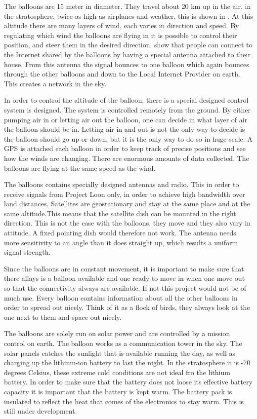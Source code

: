 The balloons are 15 meter in diameter. They travel about 20 km up in the air, in the stratosphere, twice as high as airplanes and weather, this is shown in . At this altitude there are many layers of wind, each varies in direction and speed. By regulating which wind the balloons are flying in it is possible to control their position, and steer them in the desired direction.  show that  people can connect to the Internet shared by the balloons by having a special antenna attached to their house. From this antenna the signal bounces to one balloon which again bounces through the other balloons and down to the Local Internet Provider on earth. This creates a network in the sky. 

In order to control the altitude of the balloon, there is a special designed control system is designed. The system is controlled remotely from the ground. By either pumping air in or letting air out the balloon, one can decide in what layer of air the balloon should be in. Letting air in and out is not the only way to decide is the balloon should go up or down, but it is the only way to do so in huge scale. A GPS is attached each balloon in order to keep track of precise positions and see how the winds are changing. There are enormous amounts of data collected. The balloons are flying at the same speed as the wind.  

The balloons contains specially designed antennas and radio. This in order to receive signals from Project Loon only, in order to achieve high bandwidth over land distances. 
Satellites are geostationary and stay at the same place and at the same altitude.This means that the satellite dish can be mounted in the right direction. This is not the case with the balloons, they move and they also vary in attitude. A fixed pointing dish would therefore not work. The antenna needs more sensitivity to an angle than it does straight up, which results a uniform signal strength. 

Since the balloons are in constant movement, it is important to make sure that there allays is a balloon available and one ready to move in when one move out so that the connectivity always are available. If not this project would not be of much use. Every balloon contains information about all the other balloons in order to spread out nicely. Think of it as a flock of birds, they always look at the one next to them and space out nicely.

The balloons are solely run on solar power and are controlled by a mission control on earth. The balloon works as a communication tower in the sky. The solar panels catches the sunlight that is available running the day, as well as charging up the lithium-ion battery to last the night. In the stratosphere it is -70 degrees Celsius, these extreme cold conditions are not ideal fro the lithium battery. In order to make sure that the battery does not loose its effective battery capacity it is important that the battery is kept warm. The battery pack is insulated to reflect the heat that comes of the electronics to stay warm. This is still under development. 

